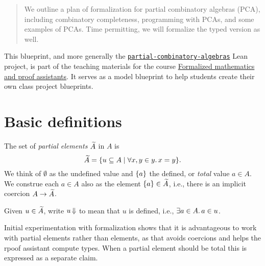 %

\begin{abstract}
  We outline a plan of formalization for partial combinatory algebras (PCA), including combinatory completeness,
  programming with PCAs, and some examples of PCAs. Time permitting, we will formalize the typed version as well.
\end{abstract}


This blueprint, and more generally the \href{https://github.com/andrejbauer/partial-combinatory-algebras}{\texttt{partial-combinatory-algebras}} Lean project, is part of the teaching materials for the course \href{https://www.andrej.com/zapiski/MAT-FORMATH-2024/book/}{Formalized mathematics and proof assistants}.
It serves as a model blueprint to help students create their own class project blueprints.

\section{Basic definitions}

The set of \emph{partial elements} $\widetilde{A}$ in $A$ is
%
\begin{equation*}
  \widetilde{A} = \{ u \subseteq A \mid \forall x, y \in y.\, x = y\}.
\end{equation*}
%
We think of $\emptyset$ as the undefined value and $\{a\}$ the defined, or \emph{total} value $a \in A$.
We construe each $a \in A$ also as the element $\{a\} \in \widetilde{A}$, i.e., there is an implicit coercion $A \to \widetilde{A}$.

Given $u \in \widetilde{A}$, write $u\,{\Downarrow}$ to mean that $u$ is defined, i.e., $\exists a \in A.\, a \in u$.

Initial experimentation with formalization shows that it is advantageous to work with partial elements rather than elements, as that avoids coercions and helps the rpoof assistant compute types. When a partial element should be total this is expressed as a separate claim.

